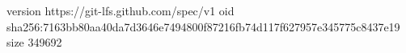 version https://git-lfs.github.com/spec/v1
oid sha256:7163bb80aa40da7d3646e7494800f87216fb74d117f627957e345775c8437e19
size 349692
